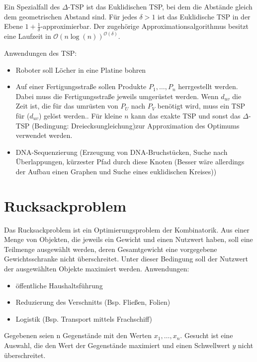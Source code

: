 Ein Spezialfall des \(\Delta\)-TSP ist das Euklidischen TSP, bei dem die Abstände gleich dem geometrischen Abstand sind. Für jedes \(\delta > 1\) ist das Euklidische TSP in der Ebene \(1+\frac{1}{\delta}\)-approximierbar.
Der zugehörige Approximationsalgorithmus besitzt eine Laufzeit in \(\mathcal{O}(n \log(n))^{\mathcal{O}(\delta)}\).

Anwendungen des TSP:
\begin{itemize}
	\item Roboter soll Löcher in eine Platine bohren
	\item Auf einer Fertigungsstraße sollen Produkte \(P_{1}, \ldots, P_{n}\) herrgestellt werden.
		Dabei muss die Fertigungsstraße jeweils umgerüstet werden.
		Wenn \(d_{uv}\) die Zeit ist, die für das umrüsten von \(P_{U}\) nach \(P_{V}\) benötigt wird, muss ein TSP für (\(d_{uv}\)) gelöst werden..
		Für kleine \(n\) kann das exakte TSP und sonst das \(\Delta\)-TSP (Bedingung: Dreiecksungleichung)zur Approximation des Optimums verwendet werden.
	\item DNA-Sequenzierung (Erzeugung von DNA-Bruchstücken, Suche nach Über\-lap\-pungen, kürzester Pfad durch diese Knoten (Besser wäre allerdings der Aufbau einen Graphen und Suche eines euklidischen Kreises))
\end{itemize}



\section{Rucksackproblem}
Das Rucksackproblem ist ein Optimierungsproblem der Kombinatorik.
Aus einer Menge von Objekten, die jeweils ein Gewicht und einen Nutzwert haben, soll eine Teilmenge ausgewählt werden, deren Gesamtgewicht eine vorgegebene Gewichtsschranke nicht überschreitet.
Unter dieser Bedingung soll der Nutzwert der ausgewählten Objekte maximiert werden.
Anwendungen:
\begin{itemize}
	\item öffentliche Haushaltsführung
	\item Reduzierung des Verschnitts (Bsp. Fließen, Folien)
	\item Logistik (Bsp. Transport mittels Frachschiff)
\end{itemize}

Gegebenen seien n Gegenstände mit den Werten \(x_{1}, \dots, x_{n}\).
Gesucht ist eine Auswahl, die den Wert der Gegenstände maximiert und einen Schwellwert \(y\) nicht überschreitet.


